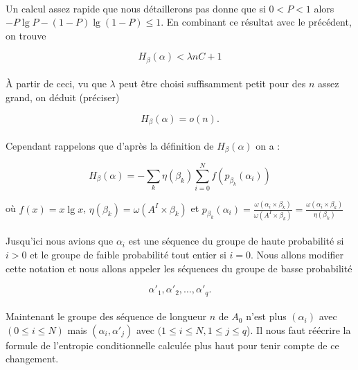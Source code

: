 	\paragraph{}
	Un calcul assez rapide que nous détaillerons pas donne que si $0<P<1$ alors
	$-P\lg P -(1-P)\lg(1-P)\le 1$. En combinant ce résultat avec le précédent,
	on trouve
	
	\[H_\beta(\alpha) < \lambda nC + 1\]
	
	\paragraph{}
	À partir de ceci, vu que $\lambda$ peut être choisi suffisamment petit pour
	 des $n$ assez grand, on déduit (préciser)
	
	\[H_\beta(\alpha)=o(n).\]
	
	\paragraph{}
	Cependant rappelons que d'après la définition de $H_\beta(\alpha)$ on a :
	
	\[
		H_\beta(\alpha) = 
		- \sum_k\eta(\beta_k)\sum_{i=0}^Nf(p_{\beta_k}(\alpha_i))
	\]
	
	où $f(x) = x \lg x$, $\eta(\beta_k) = \omega(A^I \times \beta_k)$ 
	et 
		$p_{\beta_k}(\alpha_i) = 
		\frac{\omega(\alpha_i \times \beta_k)}{\omega(A^I \times \beta_k)}=
		\frac{\omega(\alpha_i \times \beta_k)}{\eta(\beta_k)}$	
	
	\paragraph{}
	Jusqu'ici nous avions que $\alpha_i$ est une séquence du groupe de haute 
	probabilité si $i>0$ et le groupe de faible probabilité tout entier si 
	$i=0$. Nous allons modifier cette notation et nous allons appeler les 
	séquences du groupe de basse probabilité 
	
	\[\alpha'_1, \alpha'_2, \dots, \alpha'_q.\]
	
	\paragraph{}
	Maintenant le groupe des séquence de longueur $n$ de $A_0$ n'est plus 
	$(\alpha_i)$ avec $(0 \le i \le N)$ mais $(\alpha_i, \alpha'_j)$ avec 
	$(1\le i \le N, 1 \le j \le q$). Il nous faut réécrire la formule de
	 l'entropie conditionnelle calculée plus haut pour tenir compte de ce
	 changement.
	
